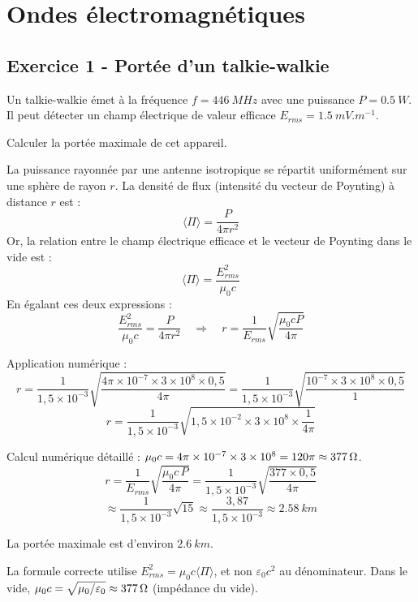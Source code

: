 \documentclass[12pt,a4paper]{article}
\begin{document}
\section{Ondes électromagnétiques}

\subsection*{Exercice 1 - Portée d'un talkie-walkie \niveau{\moyen}}

\begin{boiteexercice}
Un talkie-walkie émet à la fréquence $f = \qty{446}{MHz}$ avec une puissance $P = \qty{0.5}{W}$. Il peut détecter un champ électrique de valeur efficace $E_{rms} = \qty{1.5}{mV.m^{-1}}$.

Calculer la portée maximale de cet appareil.
\end{boiteexercice}

\begin{boitecorrige}
La puissance rayonnée par une antenne isotropique se répartit uniformément sur une sphère de rayon $r$. La densité de flux (intensité du vecteur de Poynting) à distance $r$ est :
\[
\langle\Pi\rangle = \frac{P}{4\pi r^2}
\]
Or, la relation entre le champ électrique efficace et le vecteur de Poynting dans le vide est :
\[
\langle\Pi\rangle = \frac{E_{rms}^2}{\mu_0 c}
\]
En égalant ces deux expressions :
\[
\frac{E_{rms}^2}{\mu_0 c} = \frac{P}{4\pi r^2} \quad \Rightarrow \quad r = \frac{1}{E_{rms}}\sqrt{\frac{\mu_0 c P}{4\pi}}
\]

Application numérique :
\[
r = \frac{1}{1{,}5\times10^{-3}}\sqrt{\frac{4\pi\times10^{-7}\times3\times10^8\times0{,}5}{4\pi}}
= \frac{1}{1{,}5\times10^{-3}}\sqrt{\frac{10^{-7}\times3\times10^8\times0{,}5}{1}}
\]
\[
r = \frac{1}{1{,}5\times10^{-3}}\sqrt{1{,}5\times10^{-2}\times 3\times10^8\times \frac{1}{4\pi}}
\]

Calcul numérique détaillé : $\mu_0 c = 4\pi\times10^{-7}\times3\times10^8 = 120\pi \approx \num{377}\,\Omega$.
\[
r = \frac{1}{E_{rms}}\sqrt{\frac{\mu_0 c\, P}{4\pi}}
  = \frac{1}{1{,}5\times10^{-3}}\sqrt{\frac{377\times0{,}5}{4\pi}}
\]
\[
  \approx \frac{1}{1{,}5\times10^{-3}}\sqrt{15}
  \approx \frac{3{,}87}{1{,}5\times10^{-3}} \approx \qty{2.58}{km}
\]

La portée maximale est d'environ $\qty{2.6}{km}$.

\begin{boiteremarque}
La formule correcte utilise $E_{rms}^2 = \mu_0 c \langle\Pi\rangle$, et non $\varepsilon_0 c^2$ au dénominateur. Dans le vide, $\mu_0 c = \sqrt{\mu_0/\varepsilon_0} \approx \num{377}\,\Omega$ (impédance du vide).
\end{boiteremarque}
\end{boitecorrige}
\end{document}
